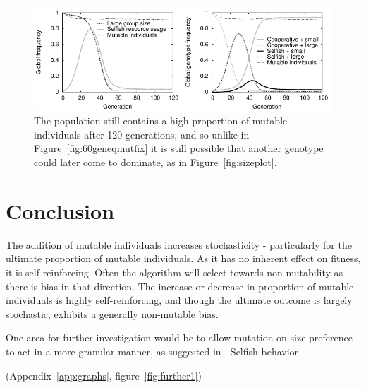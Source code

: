 \documentclass[11pt]{article}
\begin{document}
\begin{figure}[!ht]
  \centering
  \includegraphics{120geninteresting.pdf}
  \caption{The population still contains a high proportion of mutable individuals after 120 generations, and so unlike in Figure~\ref{fig:60geneqmutfix} it is still possible that another genotype could later come to dominate, as in Figure~\ref{fig:sizeplot}.}
  \label{fig:120geninteresting}
\end{figure}

\section{Conclusion}
The addition of mutable individuals increases stochasticity - particularly for the ultimate proportion of mutable individuals. As it has no inherent effect on fitness, it is self reinforcing. Often the algorithm will select towards non-mutability as there is bias in that direction.
The increase or decrease in proportion of mutable individuals is highly self-reinforcing, and though the ultimate outcome is largely stochastic, exhibits a generally non-mutable bias.

One area for further investigation would be to allow mutation on size preference to act in a more granular manner, as suggested in \citet{thesis}. Selfish behavior

(Appendix~\ref{app:graphs}, figure~\ref{fig:further1})


\newpage

{}
\end{document}
